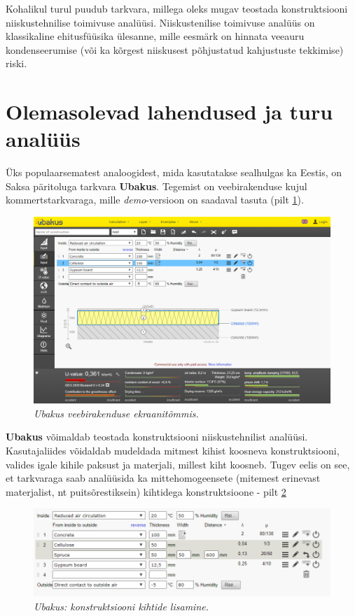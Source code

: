 Kohalikul turul puudub tarkvara, millega oleks mugav teostada konstruktsiooni
niiskustehnilise toimivuse analüüsi. Niiskustenilise toimivuse analüüs on klassikaline ehitusfüüsika ülesanne, mille 
eesmärk on hinnata veeauru kondenseerumise (või ka kõrgest niiskusest põhjustatud kahjustuste tekkimise) riski.




\section{Olemasolevad lahendused ja turu analüüs}
Üks populaarsematest analoogidest, mida kasutatakse sealhulgas ka Eestis, on Saksa päritoluga tarkvara \textbf{Ubakus}. 
Tegemist on veebirakenduse kujul kommertstarkvaraga, mille \textit{demo}-versioon on saadaval tasuta (pilt \ref{fig:ubakus_sample}). 
\begin{figure}[ht]
    \centering
    \includegraphics[width=.8\textwidth]{figures/problem_statement/01_ubakus.png}
    \caption{\textit{Ubakus veebirakenduse ekraanitõmmis.}}
    \label{fig:ubakus_sample}
\end{figure}

\textbf{Ubakus} võimaldab teostada konstruktsiooni niiskustehnilist analüüsi. Kasutajaliides võidaldab 
mudeldada mitmest kihist koosneva konstruktsiooni, valides igale kihile paksust ja materjali, millest 
kiht koosneb. Tugev eelis on see, et tarkvaraga saab analüüsida ka mittehomogeensete (mitemest erinevast 
materjalist, nt puitsõrestiksein) kihtidega konstruktsioone - pilt \ref{fig:ubakus_layers}

\begin{figure}[ht]
    \centering
    \includegraphics[width=.6\textwidth]{figures/problem_statement/02_ubakus_layers.png}
    \caption{\textit{Ubakus: konstruktsiooni kihtide lisamine.}}
    \label{fig:ubakus_layers}
\end{figure}

